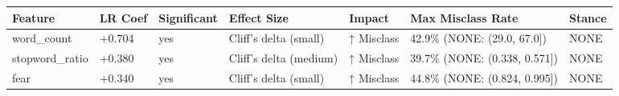\begin{tabular}{lllllll}
\toprule
Feature & LR Coef & Significant & Effect Size & Impact & Max Misclass Rate & Stance \\
\midrule
word\_count & +0.704 & yes & Cliff's delta (small) & ↑ Misclass & 42.9\% (NONE: (29.0, 67.0]) & NONE \\
stopword\_ratio & +0.380 & yes & Cliff's delta (medium) & ↑ Misclass & 39.7\% (NONE: (0.338, 0.571]) & NONE \\
fear & +0.340 & yes & Cliff's delta (small) & ↑ Misclass & 44.8\% (NONE: (0.824, 0.995]) & NONE \\
\bottomrule
\end{tabular}
